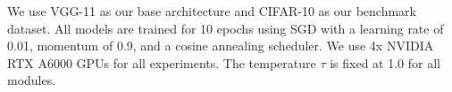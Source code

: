 We use VGG-11 \cite{vgg2014} as our base architecture and CIFAR-10 \cite{cifar10} as our benchmark dataset. All models are trained for 10 epochs using SGD with a learning rate of 0.01, momentum of 0.9, and a cosine annealing scheduler. We use 4x NVIDIA RTX A6000 GPUs for all experiments. The temperature $\tau$ is fixed at 1.0 for all \methodname modules.
